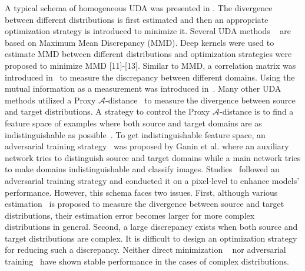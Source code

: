 \documentclass[journal,twocolumn]{IEEEtran}
\theoremstyle{definition}
\begin{document}
A typical schema of homogeneous UDA was presented in \cite{ben2010theory}.  The divergence between different distributions is first estimated and then an appropriate optimization strategy is introduced to minimize it.
Several UDA methods 
~\cite{pmlr-v37-long15,zellinger2017central,pmlr-v119-liu20m,long2017deep,long2016unsupervised}
are based on Maximum Mean Discrepancy (MMD). Deep kernels were used to estimate MMD between different distributions \cite{pmlr-v37-long15,zellinger2017central} and optimization strategies were proposed to minimize MMD [11]-[13].  Similar to MMD,  a correlation matrix was introduced in~\cite{sun2016deep} to measure the discrepancy between different domains. Using the mutual information as a measurement was introduced in~\cite{pmlr-v119-liang20a}.  
Many other UDA methods utilized a Proxy $\mathcal{A}$-distance~\cite{ben2010theory} to measure  the divergence between source and target distributions. A strategy to control the Proxy $\mathcal{A}$-distance is to find a feature space of examples where both source and target domains are as indistinguishable as possible~\cite{ben2010theory}. To get indistinguishable feature space, an adversarial training strategy~\cite{ganin2016domain} was proposed by Ganin et al. where an auxiliary network tries to distinguish source and target domains while a main network tries to make domains indistinguishable and classify images. Studies~\cite{liu2016coupled,bousmalis2017unsupervised} followed an adversarial training strategy and conducted it on a pixel-level to enhance models' performance. However, this schema faces two issues. First, although various estimation~\cite{ben2010theory,pmlr-v37-long15,zellinger2017central,sun2016deep} 
is proposed to measure the divergence between source and target distributions, their estimation error becomes larger for more complex distributions in general. Second, a large discrepancy exists when both source and target distributions are complex. It is difficult to design an optimization strategy for reducing such a discrepancy. Neither direct minimization
~\cite{pmlr-v37-long15,zellinger2017central,sun2016deep} 
nor adversarial training~\cite{8833506,arjovsky2017towards} have shown stable performance in the cases of complex distributions.
\end{document}
